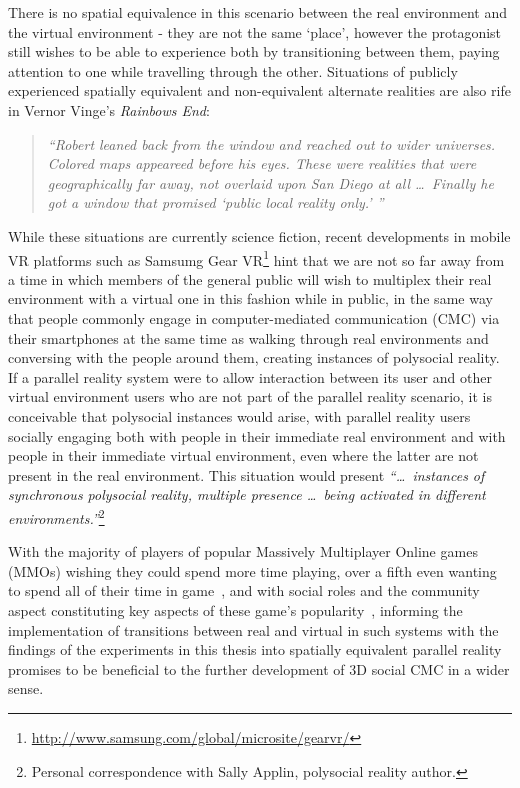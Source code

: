 There is no spatial equivalence in this scenario between the real environment and the virtual environment - they are not the same `place', however the protagonist still wishes to be able to experience both by transitioning between them, paying attention to one while travelling through the other. Situations of publicly experienced spatially equivalent and non-equivalent alternate realities are also rife in Vernor Vinge's \textit{Rainbows End}:

\begin{quote}
	\textit{``Robert leaned back from the window and reached out to wider universes. Colored maps appeareed before his eyes. These were realities that were geographically far away, not overlaid upon San Diego at all \ldots\ Finally he got a window that promised `public local reality only.' ''}~\cite{Vinge2006}
\end{quote}

While these situations are currently science fiction, recent developments in mobile VR platforms such as Samsumg Gear VR\footnote{\url{http://www.samsung.com/global/microsite/gearvr/}} hint that we are not so far away from a time in which members of the general public will wish to multiplex their real environment with a virtual one in this fashion while in public, in the same way that people commonly engage in computer-mediated communication (CMC) via their smartphones at the same time as walking through real environments and conversing with the people around them, creating instances of polysocial reality. If a parallel reality system were to allow interaction between its user and other virtual environment users who are not part of the parallel reality scenario, it is conceivable that polysocial instances would arise, with parallel reality users socially engaging both with people in their immediate real environment and with people in their immediate virtual environment, even where the latter are not present in the real environment. This situation would present \textit{``\ldots\ instances of synchronous polysocial reality, multiple presence \ldots\ being activated in different environments.''}\footnote{Personal correspondence with Sally Applin, polysocial reality author.}

With the majority of players of popular Massively Multiplayer Online games (MMOs) wishing they could spend more time playing, over a fifth even wanting to spend all of their time in game~\cite{Castronova2006}, and with social roles and the community aspect constituting key aspects of these game's popularity~\cite{Castronova2006, Bartle2004}, informing the implementation of transitions between real and virtual in such systems with the findings of the experiments in this thesis into spatially equivalent parallel reality promises to be beneficial to the further development of 3D social CMC in a wider sense.

